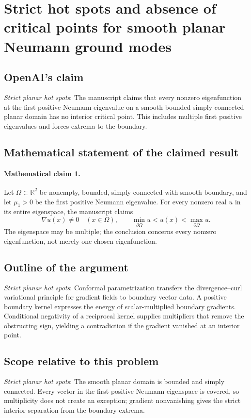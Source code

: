 \documentclass[11pt]{article}
\begin{document}
\section*{Strict hot spots and absence of critical points for smooth planar Neumann ground modes}

\subsection{OpenAI's claim}
\textit{Strict planar hot spots}: The manuscript claims that every nonzero eigenfunction at the first positive Neumann eigenvalue on a smooth bounded simply connected planar domain has no interior critical point. This includes multiple first positive eigenvalues and forces extrema to the boundary.

\subsection{Mathematical statement of the claimed result}
\paragraph{Mathematical claim 1.} Let $\Omega\subset\mathbb R^2$ be nonempty, bounded, simply connected with smooth boundary, and let $\mu_1>0$ be the first positive Neumann eigenvalue. For every nonzero real $u$ in its entire eigenspace, the manuscript claims \[\nabla u(x)\ne0\quad(x\in\Omega),\qquad\min_{\partial\Omega}u<u(x)<\max_{\partial\Omega}u.\] The eigenspace may be multiple; the conclusion concerns every nonzero eigenfunction, not merely one chosen eigenfunction.

\subsection{Outline of the argument}
\textit{Strict planar hot spots}: Conformal parametrization transfers the divergence--curl variational principle for gradient fields to boundary vector data. A positive boundary kernel expresses the energy of scalar-multiplied boundary gradients. Conditional negativity of a reciprocal kernel supplies multipliers that remove the obstructing sign, yielding a contradiction if the gradient vanished at an interior point.

\subsection{Scope relative to this problem}
\textit{Strict planar hot spots}: The smooth planar domain is bounded and simply connected. Every vector in the first positive Neumann eigenspace is covered, so multiplicity does not create an exception; gradient nonvanishing gives the strict interior separation from the boundary extrema.
\end{document}
